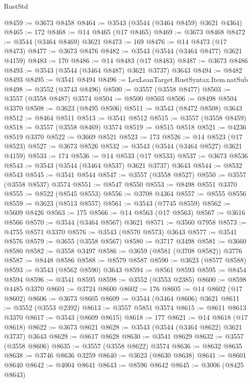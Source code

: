 \begin{lexlean}{RustStd}
\begin{coremodule}
@8459 := @3673 @8458
@8464 := @3543 (@3544 (@3464 @8459) @3621 @4364)
@8465 := 172
@8468 := @14 @8465 (@17 @8465)
@8469 := @3673 @8468
@8472 := @3544 (@3464 @8469) @3621
@8473 := 169
@8476 := @14 @8473 (@17 @8473)
@8477 := @3673 @8476
@8482 := @3543 (@3544 (@3464 @8477) @3621 @4159)
@8483 := 170
@8486 := @14 @8483 (@17 @8483)
@8487 := @3673 @8486
@8493 := @3543 (@3544 (@3464 @8487) @3621 @3737) @3643
@8494 := @8482 @8493
@8495 := @3541 @8494
@8496 := LexLeanTarget.RustSyntax.Item.natSub
@8498 := @3552 (@3743 @8496)
@8500 := @3557 (@3558 @8477)
@8503 := @3557 (@3558 @8487) @3574
@8504 := @8500 @8503
@8506 := @8498 @8504 @3370
@8508 := @3623 (@8495 @8506)
@8511 := @3543 (@8472 @8508) @3643
@8512 := @8464 @8511
@8513 := @3541 @8512
@8515 := @3557 (@3558 @8459)
@8518 := @3557 (@3558 @8469) @3574
@8519 := @8515 @8518
@8521 := @4236 @8519 @3370
@8522 := @3669 @8521
@8523 := 173
@8526 := @14 @8523 (@17 @8523)
@8527 := @3673 @8526
@8532 := @3543 (@3544 (@3464 @8527) @3621 @4159)
@8533 := 174
@8536 := @14 @8533 (@17 @8533)
@8537 := @3673 @8536
@8543 := @3543 (@3544 (@3464 @8537) @3621 @3737) @3643
@8544 := @8532 @8543
@8545 := @3541 @8544
@8547 := @3557 (@3558 @8527)
@8550 := @3557 (@3558 @8537) @3574
@8551 := @8547 @8550
@8553 := @8498 @8551 @3370
@8555 := @8522 (@8545 @8553)
@8556 := @3708 @4364
@8557 := @8555 @8556
@8559 := @3623 (@8513 @8557)
@8561 := @3543 (@7745 @8559)
@8562 := @5609 @8426
@8563 := 175
@8566 := @14 @8563 (@17 @8563)
@8567 := @3616 @8566
@8570 := @3544 (@3464 @8567) @3621
@8571 := @3560 @7958
@8573 := @4755 @8571 @3370
@8576 := @3543 (@8570 @8573) @3643
@8577 := @3541 @8576
@8579 := @3655 (@3558 @8567)
@8580 := @3717 @3498
@8581 := @3660 @8580
@8582 := @3558 @3497
@8586 := @3659 (@8581 (@3708 @8582)) @3776
@8587 := @8448 @8586
@8588 := @8579 @8587
@8590 := @3623 (@8577 @8588)
@8593 := @3543 (@8562 @8590) @3643
@8594 := @8561 @8593
@8595 := @8454 @8594
@8596 := @3541 @8595
@8598 := @3552 (@3553 @2385)
@8600 := @8598 @4485 @3370
@8601 := @3724 @8600
@8602 := 176
@8605 := @14 @8602 (@17 @8602)
@8606 := @3673 @8605
@8609 := @3544 (@3464 @8606) @3621
@8611 := @3552 (@3553 @2392)
@8613 := @3557 @5851 @3574
@8615 := @8611 @8613 @3370
@8617 := @3543 (@8609 @8615)
@8618 := 177
@8621 := @14 @8618 (@17 @8618)
@8622 := @3673 @8621
@8628 := @3543 (@3544 (@3464 @8622) @3621 @3737) @3643
@8629 := @8617 @8628
@8630 := @3541 @8629
@8632 := @3557 (@3558 @8606)
@8635 := @3557 (@3558 @8622) @3574
@8636 := @8632 @8635
@8638 := @3746 @8636 @3259
@8640 := @3623 (@8630 @8638)
@8641 := @8601 @8640
@8642 := @4004 @8641
@8643 := @8596 @8642
@8645 := @3006 (@8425 @8643)

\end{coremodule}
\end{lexlean}

